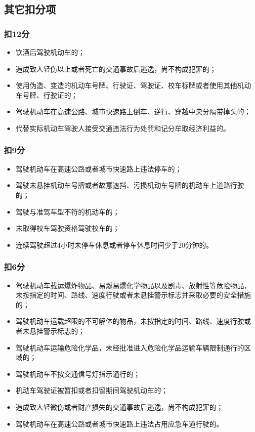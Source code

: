 \subsection{其它扣分项}

\subsubsection*{扣12分}

\begin{itemize}
    \item 饮酒后驾驶机动车的；
    \item 造成致人轻伤以上或者死亡的交通事故后逃逸，尚不构成犯罪的；
    \item 使用伪造、变造的机动车号牌、行驶证、驾驶证、校车标牌或者使用其他机动车号牌、行驶证的；
    \item 驾驶机动车在高速公路、城市快速路上倒车、逆行、穿越中央分隔带掉头的；
    \item 代替实际机动车驾驶人接受交通违法行为处罚和记分牟取经济利益的。
\end{itemize}

\subsubsection*{扣9分}

\begin{itemize}
    \item 驾驶机动车在高速公路或者城市快速路上违法停车的；
    \item 驾驶未悬挂机动车号牌或者故意遮挡、污损机动车号牌的机动车上道路行驶的；
    \item 驾驶与准驾车型不符的机动车的；
    \item 未取得校车驾驶资格驾驶校车的；
    \item 连续驾驶超过4小时未停车休息或者停车休息时间少于20分钟的。
\end{itemize}

\subsubsection*{扣6分}

\begin{itemize}
    \item 驾驶机动车载运爆炸物品、易燃易爆化学物品以及剧毒、放射性等危险物品，未按指定的时间、路线、速度行驶或者未悬挂警示标志并采取必要的安全措施的；
    \item 驾驶机动车运载超限的不可解体的物品，未按指定的时间、路线、速度行驶或者未悬挂警示标志的；
    \item 驾驶机动车运输危险化学品，未经批准进入危险化学品运输车辆限制通行的区域的；
    \item 驾驶机动车不按交通信号灯指示通行的；
    \item 机动车驾驶证被暂扣或者扣留期间驾驶机动车的；
    \item 造成致人轻微伤或者财产损失的交通事故后逃逸，尚不构成犯罪的；
    \item 驾驶机动车在高速公路或者城市快速路上违法占用应急车道行驶的。
\end{itemize}

